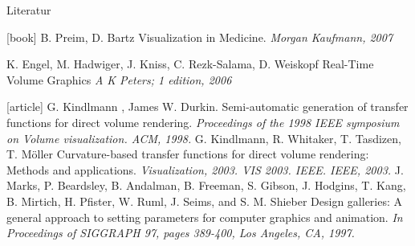 \begin{frame}[allowframebreaks]{Literatur}
 

\begin{thebibliography}{10}
[book]
\bibitem{} B. Preim, D. Bartz
\newblock Visualization in Medicine. 
\newblock \emph{Morgan Kaufmann, 2007}

\bibitem{} K. Engel, M. Hadwiger, J. Kniss, C. Rezk-Salama, D. Weiskopf
\newblock Real-Time Volume Graphics
\newblock \emph{A K Peters; 1 edition, 2006}
 
 [article]
 \bibitem{} G. Kindlmann , James W. Durkin.
 \newblock Semi-automatic generation of transfer functions for direct volume rendering. 
 \newblock \emph{Proceedings of the 1998 IEEE symposium on Volume visualization. ACM, 1998.}
%  
 \bibitem{} G. Kindlmann,  R. Whitaker,  T. Tasdizen, T. Möller
 \newblock Curvature-based transfer functions for direct volume rendering: Methods and applications.
 \newblock \emph{Visualization, 2003. VIS 2003. IEEE. IEEE, 2003.}
%  
 \bibitem{} J. Marks, P. Beardsley, B. Andalman, B. Freeman, S. Gibson, J.
Hodgins, T. Kang, B. Mirtich, H. Pfister, W. Ruml, J. Seims, and
S. M. Shieber
 \newblock Design galleries: A general approach to setting parameters for computer graphics and animation. 
 \newblock \emph{In Proceedings of SIGGRAPH 97, pages 389-400, Los Angeles, CA, 1997.}

\end{thebibliography} 

\end{frame}